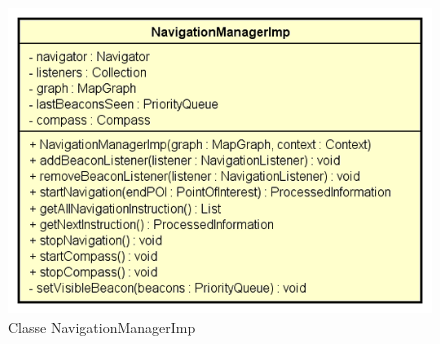 \documentclass[../DefinizioneDiProdotto.tex]{subfiles}
\begin{document}
    \begin{figure}[H]
        \centering
        \includegraphics{img/NavigationManagerImp.png}
        \caption{Classe NavigationManagerImp}\label{fig:model::NavigationManagerImp} 
    \end{figure}
\end{document}
